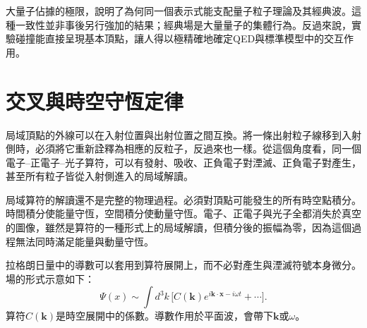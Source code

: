 大量子佔據的極限，說明了為何同一個表示式能支配量子粒子理論及其經典波。這種一致性並非事後另行強加的結果；經典場是大量量子的集體行為。反過來說，實驗碰撞能直接呈現基本頂點，讓人得以極精確地確定QED與標準模型中的交互作用。

\section{交叉與時空守恆定律}

局域頂點的外線可以在入射位置與出射位置之間互換。將一條出射粒子線移到入射側時，必須將它重新詮釋為相應的反粒子，反過來也一樣。從這個角度看，同一個電子--正電子--光子算符，可以有發射、吸收、正負電子對湮滅、正負電子對產生，甚至所有粒子皆從入射側進入的局域解讀。

\begin{classroomqa}
\end{classroomqa}

局域算符的解讀還不是完整的物理過程。必須對頂點可能發生的所有時空點積分。時間積分使能量守恆，空間積分使動量守恆。電子、正電子與光子全都消失於真空的圖像，雖然是算符的一種形式上的局域解讀，但積分後的振幅為零，因為這個過程無法同時滿足能量與動量守恆。

\begin{classroomqa}
\end{classroomqa}

\begin{classroomqa}
\end{classroomqa}

拉格朗日量中的導數可以套用到算符展開上，而不必對產生與湮滅符號本身微分。場的形式示意如下：
\begin{equation}
\Psi(x)
\sim
\int d^3k\,
\bigl[
C(\mathbf k)e^{i\mathbf k\cdot\mathbf x-i\omega t}
+\cdots
\bigr].
\end{equation}
算符\(C(\mathbf k)\)是時空展開中的係數。導數作用於平面波，會帶下\(\mathbf k\)或\(\omega\)。

